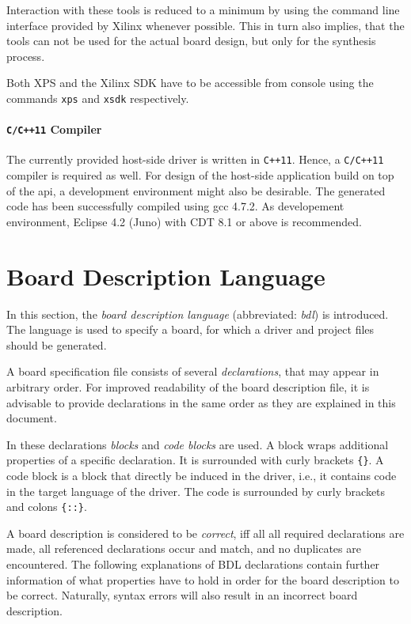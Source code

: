 \documentclass{report}
\begin{document}
Interaction with these tools is reduced to a minimum by using the command line interface provided by Xilinx whenever possible. This in turn also implies, that the tools can not be used for the actual board design, but only for the synthesis process.

Both XPS and the Xilinx SDK have to be accessible from console using the commands \texttt{xps} and \texttt{xsdk} respectively.

\paragraph{\texttt{C/C++11} Compiler}
The currently provided host-side driver is written in \texttt{C++11}. Hence, a \texttt{C/C++11} compiler is required as well. For design of the host-side application build on top of the api, a development environment might also be desirable. The generated code has been successfully compiled using gcc 4.7.2. As developement environment, Eclipse 4.2 (Juno) with CDT 8.1 or above is recommended.

\section{Board Description Language}
\label{sec:bdl}
In this section, the \textit{board description language} (abbreviated: \textit{bdl}) is introduced. The language is used to specify a board, for which a driver and project files should be generated. 

A board specification file consists of several \textit{declarations}, that may appear in arbitrary order. For improved readability of the board description file, it is advisable to provide declarations in the same order as they are explained in this document.

In these declarations \textit{blocks} and \textit{code blocks} are used. A block wraps additional properties of a specific declaration. It is surrounded with curly brackets \texttt{\{\}}.
A code block is a block that directly be induced in the driver, i.e., it contains code in the target language of the driver. The code is surrounded by curly brackets and colons \texttt{\{::\}}.

A board description is considered to be \textit{correct}, iff all all required declarations are made, all referenced declarations occur and match, and no duplicates are encountered. The following explanations of BDL declarations contain further information of what properties have to hold in order for the board description to be correct. Naturally, syntax errors will also result in an incorrect board description.
\end{document}
